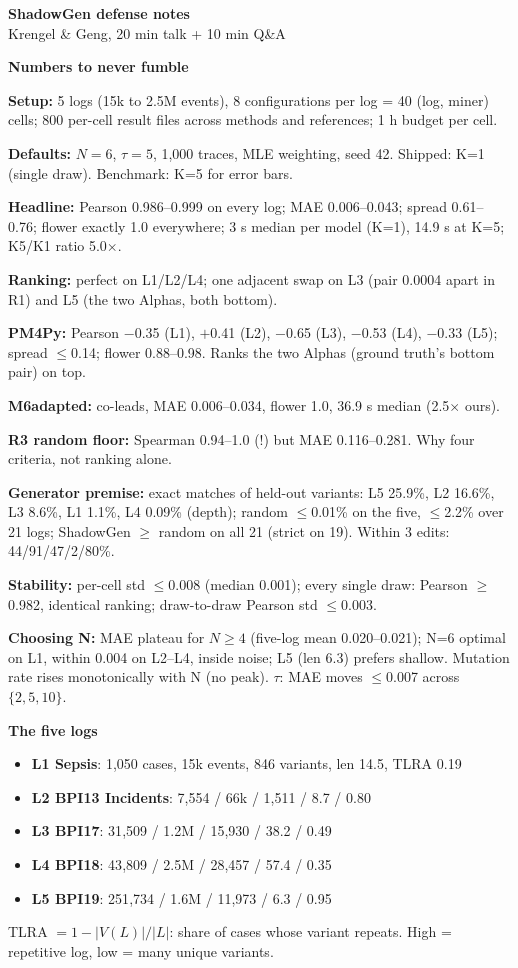 \documentclass[10pt,twocolumn]{article}
\newcommand{\hdr}[1]{\vspace{5pt}\noindent\textcolor{hd}{\textbf{\large #1}}\par\vspace{2pt}}
\newcommand{\kv}[2]{\noindent\textbf{#1} #2\par}
\begin{document}
\begin{center}\textbf{\large ShadowGen defense notes}\\[1pt]
\small Krengel \& Geng, 20 min talk + 10 min Q\&A\end{center}

\hdr{Numbers to never fumble}
\kv{Setup:}{5 logs (15k to 2.5M events), 8 configurations per log = 40 (log, miner) cells; 800 per-cell result files across methods and references; 1 h budget per cell.}
\kv{Defaults:}{$N{=}6$, $\tau{=}5$, 1{,}000 traces, MLE weighting, seed 42. Shipped: K=1 (single draw). Benchmark: K=5 for error bars.}
\kv{Headline:}{Pearson 0.986--0.999 on every log; MAE 0.006--0.043; spread 0.61--0.76; flower exactly 1.0 everywhere; 3 s median per model (K=1), 14.9 s at K=5; K5/K1 ratio 5.0$\times$.}
\kv{Ranking:}{perfect on L1/L2/L4; one adjacent swap on L3 (pair 0.0004 apart in R1) and L5 (the two Alphas, both bottom).}
\kv{PM4Py:}{Pearson $-$0.35 (L1), $+$0.41 (L2), $-$0.65 (L3), $-$0.53 (L4), $-$0.33 (L5); spread $\le$0.14; flower 0.88--0.98. Ranks the two Alphas (ground truth's bottom pair) on top.}
\kv{M6adapted:}{co-leads, MAE 0.006--0.034, flower 1.0, 36.9 s median (2.5$\times$ ours).}
\kv{R3 random floor:}{Spearman 0.94--1.0 (!) but MAE 0.116--0.281. Why four criteria, not ranking alone.}
\kv{Generator premise:}{exact matches of held-out variants: L5 25.9\%, L2 16.6\%, L3 8.6\%, L1 1.1\%, L4 0.09\% (depth); random $\le$0.01\% on the five, $\le$2.2\% over 21 logs; ShadowGen $\ge$ random on all 21 (strict on 19). Within 3 edits: 44/91/47/2/80\%.}
\kv{Stability:}{per-cell std $\le$0.008 (median 0.001); every single draw: Pearson $\ge$0.982, identical ranking; draw-to-draw Pearson std $\le$0.003.}
\kv{Choosing N:}{MAE plateau for $N\ge4$ (five-log mean 0.020--0.021); N=6 optimal on L1, within 0.004 on L2--L4, inside noise; L5 (len 6.3) prefers shallow. Mutation rate rises monotonically with N (no peak). $\tau$: MAE moves $\le$0.007 across $\{2,5,10\}$.}

\hdr{The five logs}
\begin{itemize}
\item \textbf{L1 Sepsis}: 1{,}050 cases, 15k events, 846 variants, len 14.5, TLRA 0.19
\item \textbf{L2 BPI13 Incidents}: 7{,}554 / 66k / 1{,}511 / 8.7 / 0.80
\item \textbf{L3 BPI17}: 31{,}509 / 1.2M / 15{,}930 / 38.2 / 0.49
\item \textbf{L4 BPI18}: 43{,}809 / 2.5M / 28{,}457 / 57.4 / 0.35
\item \textbf{L5 BPI19}: 251{,}734 / 1.6M / 11{,}973 / 6.3 / 0.95
\end{itemize}
TLRA $=1-|V(L)|/|L|$: share of cases whose variant repeats. High = repetitive log, low = many unique variants.
\end{document}
